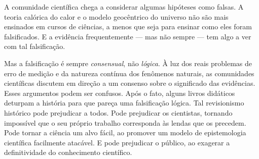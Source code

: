 A comunidade científica chega a considerar algumas hipóteses como falsas. A teoria calórica do calor e o modelo geocêntrico do universo não são mais ensinados em cursos de ciências, a menos que seja para ensinar como eles foram falsificados. E a evidência frequentemente — mas não sempre — tem algo a ver com tal falsificação.

Mas a falsificação é sempre \textit{consensual}, não \textit{lógica}. À luz dos reais problemas de erro de medição e da natureza contínua dos fenômenos naturais, as comunidades científicas discutem em direção a um consenso sobre o significado das evidências. Esses argumentos podem ser confusos. Após o fato, alguns livros didáticos deturpam a história para que pareça uma falsificação lógica. Tal revisionismo histórico pode prejudicar a todos. Pode prejudicar os cientistas, tornando impossível que o seu próprio trabalho corresponda às lendas que os precedem. Pode tornar a ciência um alvo fácil, ao promover um modelo de epistemologia científica facilmente atacável. E pode prejudicar o público, ao exagerar a definitividade do conhecimento científico.
